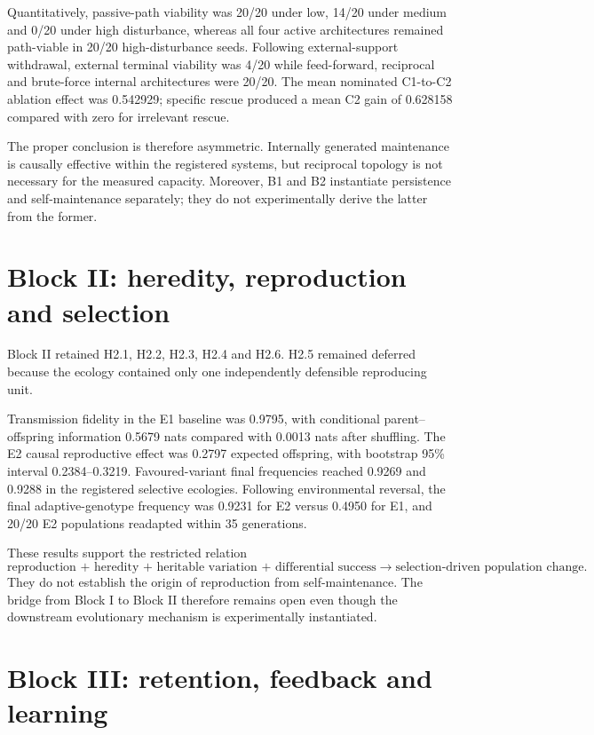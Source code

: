 \documentclass[11pt,a4paper]{article}
\begin{document}
Quantitatively, passive-path viability was 20/20 under low, 14/20 under medium and 0/20 under high disturbance, whereas all four active architectures remained path-viable in 20/20 high-disturbance seeds. Following external-support withdrawal, external terminal viability was 4/20 while feed-forward, reciprocal and brute-force internal architectures were 20/20. The mean nominated C1-to-C2 ablation effect was 0.542929; specific rescue produced a mean C2 gain of 0.628158 compared with zero for irrelevant rescue.

The proper conclusion is therefore asymmetric. Internally generated maintenance is causally effective within the registered systems, but reciprocal topology is not necessary for the measured capacity. Moreover, B1 and B2 instantiate persistence and self-maintenance separately; they do not experimentally derive the latter from the former.

\section{Block II: heredity, reproduction and selection}

Block II retained H2.1, H2.2, H2.3, H2.4 and H2.6. H2.5 remained deferred because the ecology contained only one independently defensible reproducing unit.

Transmission fidelity in the E1 baseline was 0.9795, with conditional parent--offspring information 0.5679 nats compared with 0.0013 nats after shuffling. The E2 causal reproductive effect was 0.2797 expected offspring, with bootstrap 95\% interval 0.2384--0.3219. Favoured-variant final frequencies reached 0.9269 and 0.9288 in the registered selective ecologies. Following environmental reversal, the final adaptive-genotype frequency was 0.9231 for E2 versus 0.4950 for E1, and 20/20 E2 populations readapted within 35 generations.

These results support the restricted relation
\[
\text{reproduction + heredity + heritable variation + differential success}
\rightarrow
\text{selection-driven population change}.
\]
They do not establish the origin of reproduction from self-maintenance. The bridge from Block I to Block II therefore remains open even though the downstream evolutionary mechanism is experimentally instantiated.

\section{Block III: retention, feedback and learning}
\end{document}
